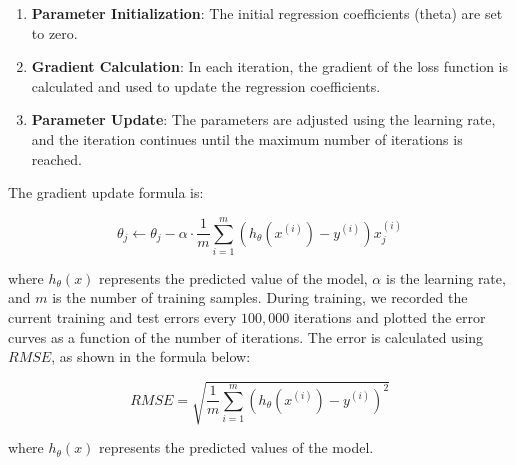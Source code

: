 \documentclass[a4paper, utf8]{ctexart}
\begin{document}
	\begin{enumerate}[itemsep=2pt, topsep=0pt, parsep=0pt]
	    \item \textbf{Parameter Initialization}: The initial regression coefficients (theta) are set to zero.
	    \item \textbf{Gradient Calculation}: In each iteration, the gradient of the loss function is calculated and used to update the regression coefficients.
	    \item \textbf{Parameter Update}: The parameters are adjusted using the learning rate, and the iteration continues until the maximum number of iterations is reached.
	\end{enumerate}
	
	The gradient update formula is:
	
	\vspace{-.5em}
	\begin{equation}
		\theta_j \leftarrow \theta_j - \alpha \cdot \frac{1}{m} \sum_{i=1}^{m}(h_\theta(x^{(i)}) - y^{(i)})x_j^{(i)}
		\nonumber
	\end{equation}
	
	where $h_\theta(x)$ represents the predicted value of the model, $\alpha$ is the learning rate, and $m$ is the number of training samples. During training, we recorded the current training and test errors every $100,000$ iterations and plotted the error curves as a function of the number of iterations. The error is calculated using $RMSE$, as shown in the formula below:
	
	\vspace{-.5em}
	\begin{equation}
		RMSE = \sqrt{\frac{1}{m}\sum_{i=1}^{m}(h_\theta(x^{(i)}) - y^{(i)})^2}
		\nonumber
	\end{equation}
	
	where $h_\theta(x)$ represents the predicted values of the model.
	
\end{document}
